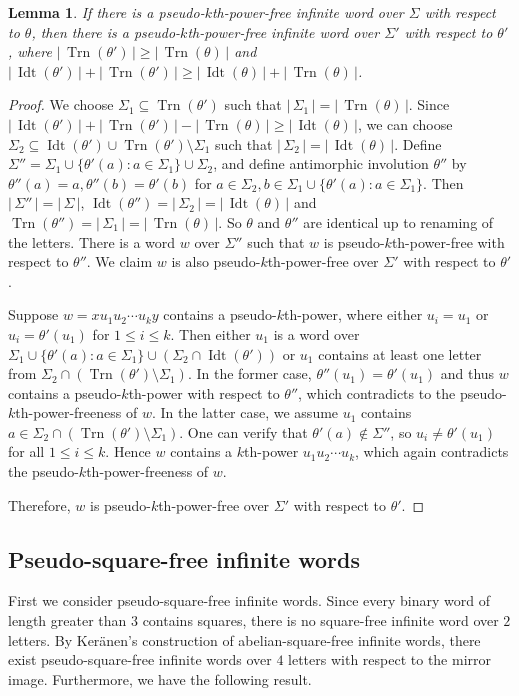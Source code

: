 \documentclass[12pt]{article}
\def\abs#1{{|\,#1\,|}}
\def\id{{\operatorname{Idt}}}
\def\tr{{\operatorname{Trn}}}
\newtheorem{lemma}[theorem]{Lemma}
\begin{document}
\begin{lemma}\label{lemma:lemma2}
If there is a pseudo-$k$th-power-free infinite word over $\Sigma$
with respect to $\theta$, then there is a pseudo-$k$th-power-free
infinite word over $\Sigma'$ with respect to $\theta'$, where
$\abs{\tr(\theta')}\geq\abs{\tr(\theta)}$ and
$\abs{\id(\theta')}+\abs{\tr(\theta')}\geq\abs{\id(\theta)}+\abs{\tr(\theta)}$.
\end{lemma}
\begin{proof}
We choose $\Sigma_1\subseteq\tr(\theta')$ such that
$\abs{\Sigma_1}=\abs{\tr(\theta)}$. Since
$\abs{\id(\theta')}+\abs{\tr(\theta')}-\abs{\tr(\theta)}\geq\abs{\id(\theta)}$,
we can choose
$\Sigma_2\subseteq\id(\theta')\cup\tr(\theta')\setminus\Sigma_1$
such that $\abs{\Sigma_2}=\abs{\id(\theta)}$. Define
$\Sigma''=\Sigma_1\cup\{\theta'(a): a\in\Sigma_1\}\cup\Sigma_2$, and
define antimorphic involution $\theta''$ by $\theta''(a)=a,
\theta''(b)=\theta'(b)$ for $a\in\Sigma_2,
b\in\Sigma_1\cup\{\theta'(a): a\in\Sigma_1\}$. Then
$\abs{\Sigma''}=\abs{\Sigma}$,
$\id(\theta'')=\abs{\Sigma_2}=\abs{\id(\theta)}$ and
$\tr(\theta'')=\abs{\Sigma_1}=\abs{\tr(\theta)}$. So $\theta$ and
$\theta''$ are identical up to renaming of the letters. There is a
word $w$ over $\Sigma''$ such that $w$ is pseudo-$k$th-power-free
with respect to $\theta''$. We claim $w$ is also
pseudo-$k$th-power-free over $\Sigma'$ with respect to $\theta'$.

Suppose $w=xu_1u_2\cdots u_ky$ contains a pseudo-$k$th-power, where
either $u_i=u_1$ or $u_i=\theta'(u_1)$ for $1\leq i\leq k$. Then
either $u_1$ is a word over $\Sigma_1\cup\{\theta'(a):
a\in\Sigma_1\}\cup(\Sigma_2\cap\id(\theta'))$ or $u_1$ contains at
least one letter from $\Sigma_2\cap(\tr(\theta')\setminus\Sigma_1)$.
In the former case, $\theta''(u_1)=\theta'(u_1)$ and thus $w$
contains a pseudo-$k$th-power with respect to $\theta''$, which
contradicts to the pseudo-$k$th-power-freeness of $w$. In the latter
case, we assume $u_1$ contains
$a\in\Sigma_2\cap(\tr(\theta')\setminus\Sigma_1)$. One can verify
that $\theta'(a)\not\in\Sigma''$, so $u_i\neq\theta'(u_1)$ for all
$1\leq i\leq k$. Hence $w$ contains a $k$th-power $u_1u_2\cdots
u_k$, which again contradicts the pseudo-$k$th-power-freeness of
$w$.

Therefore, $w$ is pseudo-$k$th-power-free over $\Sigma'$ with
respect to $\theta'$.
\end{proof}


\subsection{Pseudo-square-free infinite words}
First we consider pseudo-square-free infinite words. Since every
binary word of length greater than $3$ contains squares, there is no
square-free infinite word over $2$ letters. By Ker\"anen's
construction of abelian-square-free infinite words, there exist
pseudo-square-free infinite words over $4$ letters with respect to
the mirror image. Furthermore, we have the following result.
\end{document}
